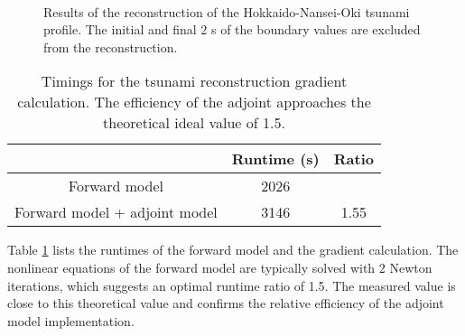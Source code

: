 \documentclass[prodmode,acmtoms]{acmsmall}
\begin{document}
\begin{figure}[t]
\centering
{}
      \\
        \caption{Results of the reconstruction of the Hokkaido-Nansei-Oki tsunami profile.
        The initial and final $2$ s of the boundary values are excluded from the reconstruction.}
\label{fig:hokkaido-nansei-oki_tsunami-results}
\end{figure}
\begin{table}
\centering
\begin{tabular}{ccc}
\toprule
       & Runtime (s) & Ratio \\
\midrule
Forward model & 2026 &     \\
Forward model + adjoint model & 3146 & 1.55 \\
\bottomrule
\end{tabular}
\caption{Timings for the tsunami reconstruction gradient calculation. 
The efficiency of the adjoint approaches the theoretical ideal value of 1.5.}
\label{tab:tsunami-timings}
\end{table}

Table \ref{tab:tsunami-timings} lists the runtimes of the forward model and the gradient calculation.
The nonlinear equations of the forward model are typically solved with 2 Newton iterations, 
which suggests an optimal runtime ratio of 1.5. 
The measured value is close to this theoretical value and confirms the relative efficiency of the adjoint model implementation. 
\end{document}
